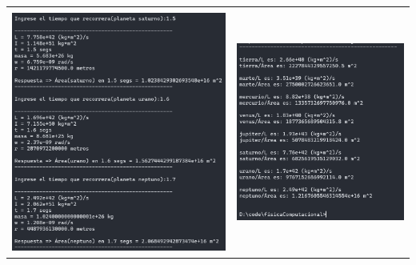 \documentclass[a4paper,12pt]{article}
\begin{document}
\begin{table}[!htbp]
\begin{tabular}{cc}
\begin{minipage}{.3\textwidth}
            \end{minipage}\\
            \begin{minipage}{.3\textwidth}
                \includegraphics[width=\linewidth]{e3_3}
            \end{minipage}&\begin{minipage}{.3\textwidth}
                \includegraphics[width=\linewidth]{e3_4}
            \end{minipage}
        \end{tabular}
    \end{table}
\end{document}
